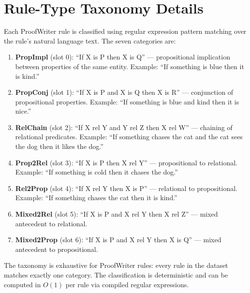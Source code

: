 \documentclass[conference]{IEEEtran}
\begin{document}
\section{Rule-Type Taxonomy Details}
\label{app:taxonomy}

Each ProofWriter rule is classified using regular expression
pattern matching over the rule's natural language text.  The
seven categories are:

\begin{enumerate}[nosep]
    \item \textbf{PropImpl} (slot 0): ``If X is P then X is Q''
          --- propositional implication between properties of the
          same entity.  Example: ``If something is blue then it
          is kind.''
    \item \textbf{PropConj} (slot 1): ``If X is P and X is Q
          then X is R'' --- conjunction of propositional
          properties.  Example: ``If something is blue and kind
          then it is nice.''
    \item \textbf{RelChain} (slot 2): ``If X rel Y and Y rel Z
          then X rel W'' --- chaining of relational predicates.
          Example: ``If something chases the cat and the cat
          sees the dog then it likes the dog.''
    \item \textbf{Prop2Rel} (slot 3): ``If X is P then X rel Y''
          --- propositional to relational.  Example: ``If
          something is cold then it chases the dog.''
    \item \textbf{Rel2Prop} (slot 4): ``If X rel Y then X is P''
          --- relational to propositional.  Example: ``If
          something chases the cat then it is kind.''
    \item \textbf{Mixed2Rel} (slot 5): ``If X is P and X rel Y
          then X rel Z'' --- mixed antecedent to relational.
    \item \textbf{Mixed2Prop} (slot 6): ``If X is P and X rel Y
          then X is Q'' --- mixed antecedent to propositional.
\end{enumerate}

The taxonomy is exhaustive for ProofWriter rules: every rule in
the dataset matches exactly one category.  The classification is
deterministic and can be computed in $O(1)$ per rule via compiled
regular expressions.




\end{document}
